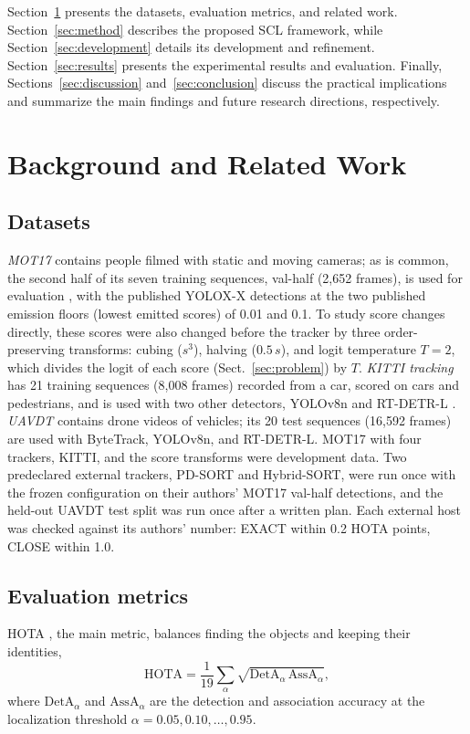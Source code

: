 \documentclass[pdflatex,sn-mathphys-num,iicol]{sn-jnl}
\newcommand{\scl}{SCL}
\begin{document}
Section~\ref{sec:related} presents the datasets, evaluation metrics, and related work.
Section~\ref{sec:method} describes the proposed \scl{} framework, while
Section~\ref{sec:development} details its development and refinement. Section~\ref{sec:results}
presents the experimental results and evaluation. Finally, Sections~\ref{sec:discussion}
and~\ref{sec:conclusion} discuss the practical implications and summarize the main findings and
future research directions, respectively.
\section{Background and Related Work}\label{sec:related}

\subsection{Datasets}\label{sec:data}
\emph{MOT17} \cite{milan2016mot16} contains people filmed with static and moving cameras; as is
common, the second half of its seven training sequences, val-half (2,652 frames), is used for
evaluation \cite{zhang2022bytetrack}, with the published YOLOX-X detections \cite{ge2021yolox} at the
two published emission floors (lowest emitted scores) of 0.01 and 0.1. To study score changes
directly, these scores were also changed before the tracker by three order-preserving transforms:
cubing ($s^3$), halving ($0.5\,s$), and logit temperature $T=2$, which divides the logit
of each score (Sect.~\ref{sec:problem}) by $T$. \emph{KITTI tracking} \cite{geiger2012kitti} has 21
training sequences (8,008 frames) recorded from a car, scored on cars and pedestrians, and is used
with two other detectors, YOLOv8n \cite{jocher2023yolov8} and RT-DETR-L \cite{zhao2024rtdetr}.
\emph{UAVDT} \cite{du2018uavdt} contains drone videos of vehicles; its 20 test sequences (16,592
frames) are used with ByteTrack, YOLOv8n, and RT-DETR-L. MOT17 with four trackers, KITTI, and the
score transforms were development data. Two predeclared external trackers, PD-SORT and Hybrid-SORT,
were run once with the frozen configuration on their authors' MOT17 val-half detections, and the
held-out UAVDT test split was run once after a written plan. Each external host was checked against
its authors' number: EXACT within 0.2 HOTA points, CLOSE within 1.0.

\subsection{Evaluation metrics}\label{sec:metrics}
HOTA \cite{luiten2021hota}, the main metric, balances finding the objects and keeping their
identities,
\begin{equation}
\mathrm{HOTA}=\frac{1}{19}\sum_{\alpha}\sqrt{\mathrm{DetA}_\alpha\,\mathrm{AssA}_\alpha},
\label{eq:hota}
\end{equation}
where $\mathrm{DetA}_\alpha$ and $\mathrm{AssA}_\alpha$ are the detection and association accuracy
at the localization threshold $\alpha=0.05,0.10,\dots,0.95$.
\end{document}
